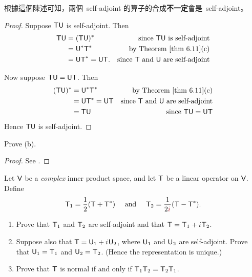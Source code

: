 \begin{note}
根據這個陳述可知，兩個\ self-adjoint 的算子的合成\textbf{不一定}會是\ self-adjoint。
\end{note}

\begin{proof}
Suppose \(\textsf{T}\textsf{U}\) is self-adjoint.
Then
\begin{align*}
    \T\U & = (\T\U)^* & \text{since \(\T\U\) is self-adjoint} \\
        & = \U^*\T^* & \text{by \THM{6.11}(c)} \\
        & = \U\T^* = \U\T. & \text{since \(\T\) and \(\U\) are self-adjoint}
\end{align*}

Now suppose \(\textsf{T}\textsf{U} = \textsf{U}\textsf{T}\).
Then
\begin{align*}
    (\T\U)^* & = \U^*\T^* & \text{by \THM{6.11}(c)} \\
        & = \U\T^* = \U\T & \text{since \(\T\) and \(\U\) are self-adjoint} \\
        & = \T\U & \text{since \(\T\U = \U\T\)}
\end{align*}
Hence \(\textsf{T}\textsf{U}\) is self-adjoint.
\end{proof}

\begin{exercise} \label{exercise 6.4.5}
Prove (b).
\end{exercise}

\begin{proof}
See .
\end{proof}

\begin{exercise} \label{exercise 6.4.6}
Let \(\textsf{V}\) be a \emph{complex} inner product space, and let \(\textsf{T}\) be a linear operator on \(\textsf{V}\).
Define
\[
    \T_1 = \frac{1}{2}(\T + \T^*) \quad \text{ and } \quad \T_2 = \frac{1}{2\MAROON{\iu}} (\T - \T^*).
\]
\begin{enumerate}
\item Prove that \(\textsf{T}_1\) and \(\textsf{T}_2\) are self-adjoint and that \(\textsf{T} = \textsf{T}_1 + {i\mkern1mu} \textsf{T}_2\).
\item Suppose also that \(\textsf{T} = \textsf{U}_1 + {i\mkern1mu}\textsf{U}_2\), where \(\textsf{U}_1\) and \(\textsf{U}_2\) are self-adjoint.
Prove that \(\textsf{U}_1 = \textsf{T}_1\) and \(\textsf{U}_2 = \textsf{T}_2\).
(Hence the representation is unique.)
\item Prove that \(\textsf{T}\) is normal if and only if \(\textsf{T}_1 \textsf{T}_2 = \textsf{T}_2 \textsf{T}_1\).
\end{enumerate}
\end{exercise}

